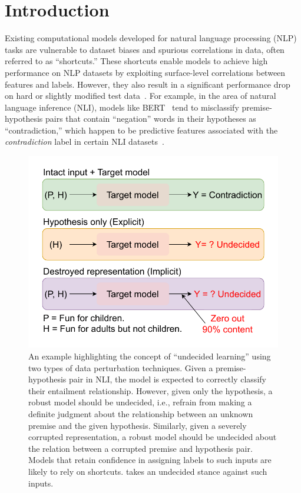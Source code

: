 \section{Introduction}

Existing computational models developed for natural language processing (NLP) tasks are vulnerable to dataset biases and spurious correlations in data, often referred to as ``shortcuts.''  %
These shortcuts enable models to achieve high performance on NLP datasets by exploiting surface-level correlations between features and labels. However, they also result in a significant performance drop on hard or slightly modified test data~\citep{naik-etal-2018-stress}. For example, in the area of natural language inference (NLI), models like BERT~\citep{devlin-etal-2019-bert} tend to misclassify premise-hypothesis pairs that contain ``negation'' words in their hypotheses as ``contradiction,'' which happen to be predictive features associated with the \textit{contradiction} label in certain NLI datasets~\citep{gururangan-etal-2018-annotation,poliak-etal-2018-hypothesis,modarressi-etal-2023-guide}.


\begin{figure}[t]
    \centering
    \vspace{-20pt}
    \includegraphics[width=.45\textwidth]{figure/motivating_example.pdf}
    \caption{An example highlighting the concept of ``undecided learning'' using two types of data perturbation techniques. Given a premise-hypothesis pair in NLI, the model is expected to correctly classify their entailment relationship. However, given only the 
    hypothesis, a robust model should be undecided, i.e., refrain from making a definite judgment 
    about the relationship between an unknown premise and %
    the given hypothesis. Similarly, given a severely corrupted representation, a robust model should be undecided about the relation between a corrupted premise and hypothesis pair.
    Models that retain confidence in assigning labels to such inputs are likely to rely on shortcuts. \OursName takes an undecided stance against such inputs.}
    \label{fig:motivating_example}
    \vspace{-10pt}
    \label{fig:example}
\end{figure}

